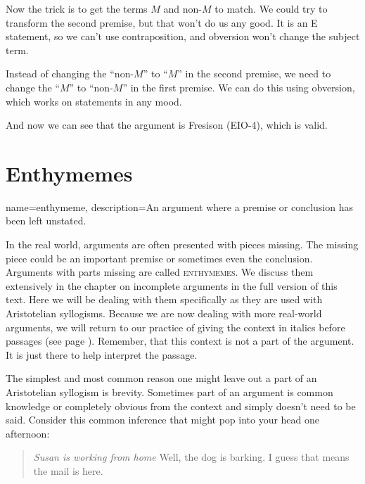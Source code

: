 Now the trick is to get the terms $M$ and non-$M$ to match. We could try to transform the second premise, but that won't do us any good. It is an E statement, so we can't use contraposition, and obversion won't change the subject term.

Instead of changing the ``non-$M$'' to ``$M$'' in the second premise, we need to change the ``$M$'' to ``non-$M$'' in the first premise. We can do this using obversion, which works on statements in any mood.

\begin{kormanize}
\end{kormanize}

And now we can see that the argument is Fresison (EIO-4), which is valid.


\section{Enthymemes}
\label{sec:enthymemes}
{
name=enthymeme,
description={An argument where a premise or conclusion has been left unstated.}
}


In the real world, arguments are often presented with pieces missing. The missing piece could be an important premise or sometimes even the conclusion.  Arguments with parts missing are called \textsc{\glspl{enthymeme}}. \label{def:enthymeme} We discuss them extensively in the chapter on incomplete arguments in the full version of this text. \label{ver_var}  Here we will be dealing with them specifically as they are used with Aristotelian syllogisms. Because we are now dealing with more real-world arguments, we will return to our practice of giving the context in italics before passages (see page \pageref{context_marker}). Remember, that this context is not a part of the argument. It is just there to help interpret the passage.

The simplest and most common reason one might leave out a part of an Aristotelian syllogism is brevity. Sometimes part of an argument is common knowledge or completely obvious from the context and simply doesn't need to be said. Consider this common inference that might pop into your head one afternoon:

\begin{quotation} \noindent \textit{Susan is working from home} Well, the dog is barking. I guess that means the mail is here.\end{quotation}

